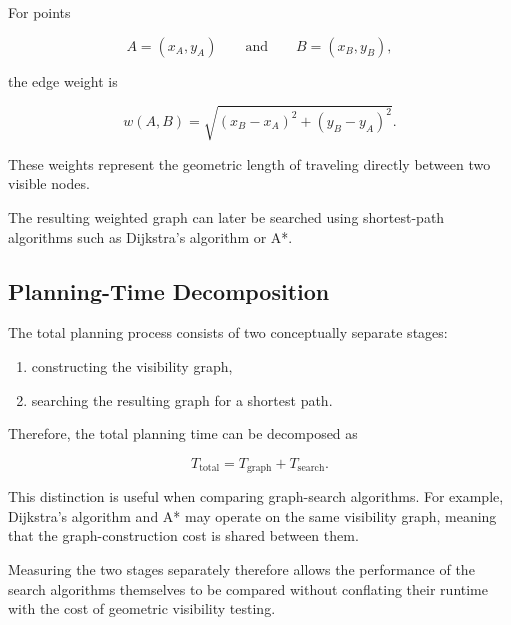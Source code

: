 For points

\[
A=(x_A,y_A)
\qquad\text{and}\qquad
B=(x_B,y_B),
\]

the edge weight is

\[
w(A,B)
=
\sqrt{
(x_B-x_A)^2
+
(y_B-y_A)^2
}.
\]

These weights represent the geometric length of traveling directly between
two visible nodes.

The resulting weighted graph can later be searched using shortest-path
algorithms such as Dijkstra's algorithm or A*.

\subsection{Planning-Time Decomposition}

The total planning process consists of two conceptually separate stages:

\begin{enumerate}
    \item constructing the visibility graph,
    \item searching the resulting graph for a shortest path.
\end{enumerate}

Therefore, the total planning time can be decomposed as

\[
T_{\text{total}}
=
T_{\text{graph}}
+
T_{\text{search}}.
\]

This distinction is useful when comparing graph-search algorithms. For
example, Dijkstra's algorithm and A* may operate on the same visibility
graph, meaning that the graph-construction cost is shared between them.

Measuring the two stages separately therefore allows the performance of
the search algorithms themselves to be compared without conflating their
runtime with the cost of geometric visibility testing.

